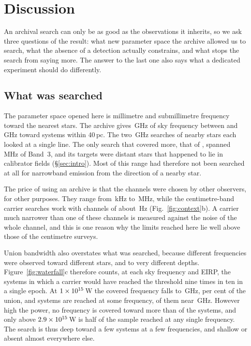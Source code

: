 \section{Discussion}
\label{sec:discussion}

An archival search can only be as good as the observations it inherits, so
we ask three questions of the result: what new parameter space
the archive allowed us to search, what the absence of a detection actually
constrains, and what stops the search from saying more. The answer to the
last one also says what a dedicated experiment should do differently.

\subsection{What was searched}
\label{sec:newspace}

The parameter space opened here is millimetre and submillimetre frequency
toward the nearest stars. The archive gives \CvUnionA\,GHz of sky frequency
between \SurvFreqLoA{} and \SurvFreqHiA\,GHz toward systems within 40\,pc.
The two \SbPriorFreqGHz\,GHz searches of nearby stars each looked at
a single line. The only search that covered more, that of
\citet{Mason2025}, spanned \MasonBandMHz\,MHz of Band~3, and its targets
were distant stars that happened to lie in calibrator fields
(\S\ref{sec:intro}). Most of this range had therefore not been
searched at all for narrowband emission from the direction of a nearby
star.

The price of using an archive is that the channels were chosen by other
observers, for other purposes. They range from \SzChanFinestKHz\,kHz to
\SzChanWidestMHz\,MHz, while the centimetre-band carrier searches work with
channels of about \SzChanLitHz\,Hz (Fig.~\ref{fig:context}b). A carrier much
narrower than one of these channels is measured against the noise of the
whole channel, and this is one reason why the limits reached here lie well
above those of the centimetre surveys.

Union bandwidth also overstates what was searched, because different
frequencies were observed toward different stars, and to very different
depths. Figure~\ref{fig:waterfall}c therefore counts, at each sky frequency
and EIRP, the systems in which a carrier would have reached the threshold
nine times in ten in a single epoch. At $1\times10^{15}$\,W the covered frequency falls to
\CovUnionAtRef\,GHz, \CovFracAtRef{} per cent of the union, and
\CovNSysAtRef{} systems are reached at some frequency, \CovNMaxAtRef{} of them
near \CovNuMaxAtRef\,GHz. However high the power, no frequency is covered
toward more than \CovNMaxFull{} of the \NSysClassA{} systems, and only above
$2.9\times10^{15}$\,W is half of the sample reached at any single frequency. The search is thus deep toward a few
systems at a few frequencies, and shallow or absent almost everywhere else.

